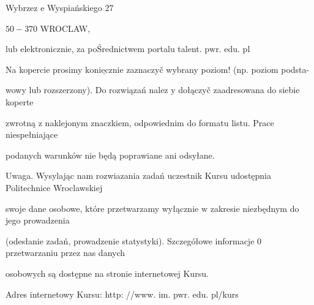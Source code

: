 \documentclass[a4paper,12pt]{article}
\begin{document}
Wybrzez $\mathrm{e}$ Wyspiańskiego 27

$50-370$ WROCLAW,

$\mathrm{l}\mathrm{u}\mathrm{b}$ elektronicznie, za poŚrednictwem portalu talent. $\mathrm{p}\mathrm{w}\mathrm{r}$. edu. pl

Na kopercie prosimy $\underline{\mathrm{k}\mathrm{o}\mathrm{n}\mathrm{i}\mathrm{e}\mathrm{c}\mathrm{z}\mathrm{n}\mathrm{i}\mathrm{e}}$ zaznaczyč wybrany poziom! (np. poziom podsta-

wowy lub rozszerzony). Do rozwiązań nalez $\mathrm{y}$ dołączyč zaadresowana do siebie koperte

zwrotną $\mathrm{z}$ naklejonym znaczkiem, odpowiednim do formatu listu. Prace niespełniające

podanych warunków nie będą poprawiane ani odsyłane.

Uwaga. Wysylając nam rozwiazania zadań uczestnik Kursu udostępnia Politechnice Wroclawskiej

swoje dane osobowe, które przetwarzamy wyłącznie $\mathrm{w}$ zakresie niezbędnym do jego prowadzenia

(odesłanie zadań, prowadzenie statystyki). Szczegółowe informacje $0$ przetwarzaniu przez nas danych

osobowych są dostępne na stronie internetowej Kursu.

Adres internetowy Kursu: http: //www. im. pwr. edu. pl/kurs
\end{document}
